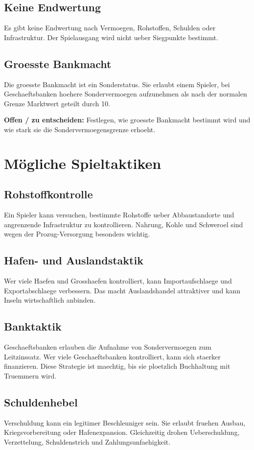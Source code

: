 \documentclass[11pt,a4paper,oneside,parskip=half]{scrreprt}
\newcommand{\offen}[1]{\begin{framed}\noindent\textbf{Offen / zu entscheiden:} #1\end{framed}}
\begin{document}
\section{Keine Endwertung}
Es gibt keine Endwertung nach Vermoegen, Rohstoffen, Schulden oder Infrastruktur. Der Spielausgang wird nicht ueber Siegpunkte bestimmt.

\section{Groesste Bankmacht}
Die groesste Bankmacht ist ein Sonderstatus. Sie erlaubt einem Spieler, bei Geschaeftsbanken hoehere Sondervermoegen aufzunehmen als nach der normalen Grenze Marktwert geteilt durch 10.

\offen{Festlegen, wie groesste Bankmacht bestimmt wird und wie stark sie die Sondervermoegensgrenze erhoeht.}

\chapter{Mögliche Spieltaktiken}

\section{Rohstoffkontrolle}
Ein Spieler kann versuchen, bestimmte Rohstoffe ueber Abbaustandorte und angrenzende Infrastruktur zu kontrollieren. Nahrung, Kohle und Schweroel sind wegen der Prozug-Versorgung besonders wichtig.

\section{Hafen- und Auslandstaktik}
Wer viele Haefen und Grosshaefen kontrolliert, kann Importaufschlaege und Exportabschlaege verbessern. Das macht Auslandshandel attraktiver und kann Inseln wirtschaftlich anbinden.

\section{Banktaktik}
Geschaeftsbanken erlauben die Aufnahme von Sondervermoegen zum Leitzinssatz. Wer viele Geschaeftsbanken kontrolliert, kann sich staerker finanzieren. Diese Strategie ist maechtig, bis sie ploetzlich Buchhaltung mit Truemmern wird.

\section{Schuldenhebel}
Verschuldung kann ein legitimer Beschleuniger sein. Sie erlaubt fruehen Ausbau, Kriegsvorbereitung oder Hafenexpansion. Gleichzeitig drohen Ueberschuldung, Verzettelung, Schuldenstrich und Zahlungsunfaehigkeit.
\end{document}
